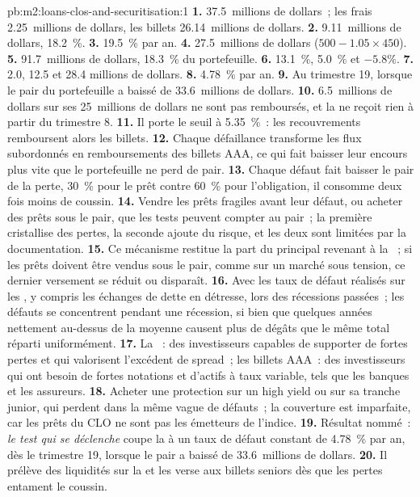 \begin{solution}{pb:m2:loans-clos-and-securitisation:1}
\textbf{1.} 37.5~millions de dollars~; les frais 2.25~millions de dollars, les billets 26.14~millions de dollars.
\textbf{2.} 9.11~millions de dollars, 18.2~\%.
\textbf{3.} 19.5~\% par an.
\textbf{4.} 27.5~millions de dollars ($500 - 1.05 \times 450$).
\textbf{5.} 91.7~millions de dollars, 18.3~\% du portefeuille.
\textbf{6.} 13.1~\%, 5.0~\% et $-5.8\%$.
\textbf{7.} 2.0, 12.5 et 28.4 millions de dollars.
\textbf{8.} 4.78~\% par an.
\textbf{9.} Au trimestre 19, lorsque le pair du portefeuille a baissé de 33.6~millions de dollars.
\textbf{10.} 6.5~millions de dollars sur ses 25~millions de dollars ne sont pas remboursés, et la  ne reçoit
rien à partir du trimestre 8.
\textbf{11.} Il porte le seuil à 5.35~\%~: les recouvrements remboursent alors les billets.
\textbf{12.} Chaque défaillance transforme les flux subordonnés en remboursements des billets AAA, ce qui
fait baisser leur encours plus vite que le portefeuille ne perd de pair.
\textbf{13.} Chaque défaut fait baisser le pair de la perte, 30~\% pour le prêt contre 60~\% pour
l'obligation, il consomme deux fois moins de coussin.
\textbf{14.} Vendre les prêts fragiles avant leur défaut, ou acheter des prêts sous le pair, que les
tests peuvent compter au pair~; la première cristallise des pertes, la seconde ajoute du risque, et
les deux sont limitées par la documentation.
\textbf{15.} Ce mécanisme restitue la part du principal revenant à la ~; si les prêts doivent être vendus
sous le pair, comme sur un marché sous tension, ce dernier versement se réduit ou disparaît.
\textbf{16.} Avec les taux de défaut réalisés sur les , y compris les
échanges de dette en détresse, lors des récessions passées~; les défauts se concentrent pendant une
récession, si bien que quelques années nettement au-dessus de la moyenne causent plus de dégâts que le même total réparti uniformément.
\textbf{17.} La ~: des investisseurs capables de supporter de fortes pertes et qui valorisent
l'excédent de spread~; les billets AAA~: des investisseurs qui ont besoin de fortes notations et d'actifs à taux variable, tels
que les banques et les assureurs.
\textbf{18.} Acheter une protection sur un  high yield ou sur sa tranche junior, qui
perdent dans la même vague de défauts~; la couverture est imparfaite, car les prêts du CLO ne sont pas
les émetteurs de l'indice.
\textbf{19.} Résultat nommé~: \emph{le test qui se déclenche} coupe la  à un
taux de défaut constant de 4.78~\% par an, dès le trimestre 19, lorsque le pair a baissé
de 33.6~millions de dollars.
\textbf{20.} Il prélève des liquidités sur la  et les verse aux billets seniors dès que
les pertes entament le coussin.
\end{solution}

